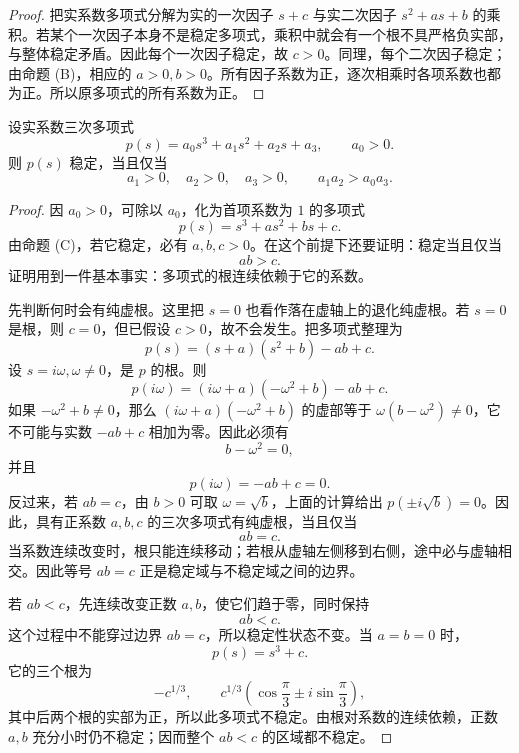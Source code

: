 \begin{proof}
把实系数多项式分解为实的一次因子 \(s+c\) 与实二次因子 \(s^2+as+b\) 的乘积。若某个一次因子本身不是稳定多项式，乘积中就会有一个根不具严格负实部，与整体稳定矛盾。因此每个一次因子稳定，故 \(c>0\)。同理，每个二次因子稳定；由命题 (B)，相应的 \(a>0,b>0\)。所有因子系数为正，逐次相乘时各项系数也都为正。所以原多项式的所有系数为正。
\end{proof}

\begin{theorem}[三次多项式的稳定判据]
\label{thm:ch2-6-cubic-stability}
 设实系数三次多项式
 \[
  p(s)=a_0s^3+a_1s^2+a_2s+a_3,
  \qquad a_0>0.
 \]
 则 \(p(s)\) 稳定，当且仅当
 \[
  a_1>0,\quad a_2>0,\quad a_3>0,
  \qquad
  a_1a_2>a_0a_3.
 \]
\end{theorem}

\begin{proof}
因 \(a_0>0\)，可除以 \(a_0\)，化为首项系数为 \(1\) 的多项式
\begin{equation}
 p(s)=s^3+as^2+bs+c.
 \label{eq:ch2-9-monic-cubic}
\end{equation}
由命题 (C)，若它稳定，必有 \(a,b,c>0\)。在这个前提下还要证明：稳定当且仅当
\begin{equation}
 ab>c.
 \label{eq:ch2-9-cubic-inequality}
\end{equation}
证明用到一件基本事实：多项式的根连续依赖于它的系数。

先判断何时会有纯虚根。这里把 \(s=0\) 也看作落在虚轴上的退化纯虚根。若 \(s=0\) 是根，则 \(c=0\)，但已假设 \(c>0\)，故不会发生。把多项式整理为
\begin{equation}
 p(s)=(s+a)(s^2+b)-ab+c.
 \label{eq:ch2-9-cubic-decomposition}
\end{equation}
设 \(s=i\omega,\omega\ne0\)，是 \(p\) 的根。则
\[
 p(i\omega)=(i\omega+a)(-\omega^2+b)-ab+c.
\]
如果 \(-\omega^2+b\ne0\)，那么 \((i\omega+a)(-\omega^2+b)\) 的虚部等于
\(\omega(b-\omega^2)\ne0\)，它不可能与实数 \(-ab+c\) 相加为零。因此必须有
\[
 b-\omega^2=0,
\]
并且
\[
 p(i\omega)=-ab+c=0.
\]
反过来，若 \(ab=c\)，由 \(b>0\) 可取 \(\omega=\sqrt b\)，上面的计算给出 \(p(\pm i\sqrt b)=0\)。因此，具有正系数 \(a,b,c\) 的三次多项式有纯虚根，当且仅当
\[
 ab=c.
\]
当系数连续改变时，根只能连续移动；若根从虚轴左侧移到右侧，途中必与虚轴相交。因此等号 \(ab=c\) 正是稳定域与不稳定域之间的边界。

若 \(ab<c\)，先连续改变正数 \(a,b\)，使它们趋于零，同时保持
\begin{equation}
 ab<c.
 \label{eq:ch2-9-bad-region}
 \end{equation}
这个过程中不能穿过边界 \(ab=c\)，所以稳定性状态不变。当 \(a=b=0\) 时，
\[
 p(s)=s^3+c.
\]
它的三个根为
\[
 -c^{1/3},\qquad
 c^{1/3}\left(\cos\frac{\pi}{3}\pm i\sin\frac{\pi}{3}\right),
\]
其中后两个根的实部为正，所以此多项式不稳定。由根对系数的连续依赖，正数 \(a,b\) 充分小时仍不稳定；因而整个 \(ab<c\) 的区域都不稳定。


\end{proof}
